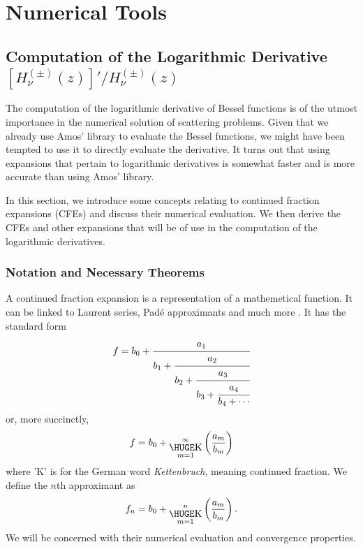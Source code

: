 \chapter{Numerical Tools}

\section{Computation of the Logarithmic Derivative $[H^{(\pm)}_\nu(z)]'/H^{(\pm)}_\nu(z)$}\label{sec:app.numTools.logDeriv}

The computation of the logarithmic derivative
of Bessel functions is of the utmost importance in the numerical solution 
of scattering problems. Given that we already use Amos' library \cite{AMO86} to evaluate
the Bessel functions, we might have been tempted to use it 
to directly evaluate the derivative. It turns out that using
expansions that pertain to logarithmic derivatives is somewhat
faster and is more accurate than using Amos' library. 

In this section, we introduce some concepts relating to 
continued fraction expansions (CFEs) and discuss their numerical
evaluation. We then derive the CFEs and other expansions that will
be of use in the computation of the logarithmic derivatives.

\subsection{Notation and Necessary Theorems}
A continued fraction expansion is a representation
of a mathemetical function. It can be linked to 
Laurent series, Padé approximants and much more 
\cite{CUY2008}. It has the standard form 
  \begin{equation}
    f = b_0+\cfrac{a_1}{b_1+\cfrac{a_2}{b_2+\cfrac{a_3}{b_3+\cfrac{a_4}{b_4+\cdots}}}}
  \end{equation}
or, more succinctly, 
  \begin{equation}
   f = b_0 + \bigk_{m=1}^\infty\left(\frac{a_m}{b_m}\right)
  \end{equation}
where 'K' is for the German word \textit{Kettenbruch}, meaning continued fraction.
We define the $n$th approximant as
  \begin{equation}
   f_n = b_0 + \bigk_{m=1}^n\left(\frac{a_m}{b_m}\right).
  \end{equation}
We will be concerned with their numerical evaluation and convergence properties.

